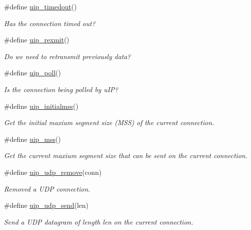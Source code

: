 \begin{CompactItemize}
\#define \hyperlink{a00064_g7b2ac4b18bd2ac3912fe67b3b17158c3}{uip\_\-timedout}()
\begin{CompactList}\small\item\em Has the connection timed out? \item\end{CompactList}\item 
\#define \hyperlink{a00064_ga8933ad15a2e2947dae4a5cff50e6007}{uip\_\-rexmit}()
\begin{CompactList}\small\item\em Do we need to retransmit previously data? \item\end{CompactList}\item 
\#define \hyperlink{a00064_g58bb90796c1cdad3aac2ecf44d87b20e}{uip\_\-poll}()
\begin{CompactList}\small\item\em Is the connection being polled by u\-IP? \item\end{CompactList}\item 
\hypertarget{a00064_ga87feebc7cffd4d8300e776cf64e4fec}{
\#define \hyperlink{a00064_ga87feebc7cffd4d8300e776cf64e4fec}{uip\_\-initialmss}()}
\label{a00064_ga87feebc7cffd4d8300e776cf64e4fec}

\begin{CompactList}\small\item\em Get the initial maxium segment size (MSS) of the current connection. \item\end{CompactList}\item 
\#define \hyperlink{a00064_gb5fecbc62edd128012cea0f47b57ab9f}{uip\_\-mss}()
\begin{CompactList}\small\item\em Get the current maxium segment size that can be sent on the current connection. \item\end{CompactList}\item 
\#define \hyperlink{a00064_gf2dbaceb10c67783a115075b5b6d66df}{uip\_\-udp\_\-remove}(conn)
\begin{CompactList}\small\item\em Removed a UDP connection. \item\end{CompactList}\item 
\#define \hyperlink{a00064_ge5ab69d40013e6cf86ef1763c95d920e}{uip\_\-udp\_\-send}(len)
\begin{CompactList}\small\item\em Send a UDP datagram of length len on the current connection. \item\end{CompactList}\end{CompactItemize}
